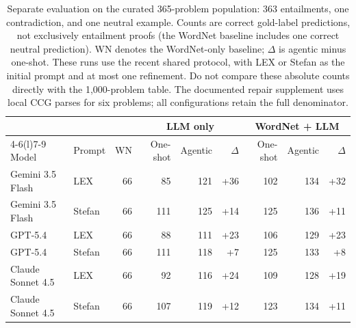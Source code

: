 \begin{table}[t]
\centering
\small
\setlength{\tabcolsep}{4pt}
\begin{tabular}{@{}llrrrrrrr@{}}
\toprule
& & & \multicolumn{3}{c}{LLM only} & \multicolumn{3}{c}{WordNet + LLM} \\
\cmidrule(lr){4-6}\cmidrule(l){7-9}
Model & Prompt & WN & One-shot & Agentic & $\Delta$ & One-shot & Agentic & $\Delta$ \\
\midrule
Gemini 3.5 Flash & LEX & 66 & 85 & 121 & +36 & 102 & 134 & +32 \\
Gemini 3.5 Flash & Stefan & 66 & 111 & 125 & +14 & 125 & 136 & +11 \\
\addlinespace[2pt]
GPT-5.4 & LEX & 66 & 88 & 111 & +23 & 106 & 129 & +23 \\
GPT-5.4 & Stefan & 66 & 111 & 118 & +7 & 125 & 133 & +8 \\
\addlinespace[2pt]
Claude Sonnet 4.5 & LEX & 66 & 92 & 116 & +24 & 109 & 128 & +19 \\
Claude Sonnet 4.5 & Stefan & 66 & 107 & 119 & +12 & 123 & 134 & +11 \\
\bottomrule
\end{tabular}
\caption{Separate evaluation on the curated 365-problem population:
363 entailments, one contradiction, and one neutral example. Counts are
correct gold-label predictions, not exclusively entailment proofs (the
WordNet baseline includes one correct neutral prediction). WN denotes the
WordNet-only baseline; $\Delta$ is agentic minus one-shot. These runs use
the recent shared protocol, with LEX or Stefan as the initial prompt and
at most one refinement. Do not compare these absolute counts directly
with the 1,000-problem table. The documented repair supplement uses local
CCG parses for six problems; all configurations retain the full denominator.}
\label{tab:langpro-results-365}
\end{table}
